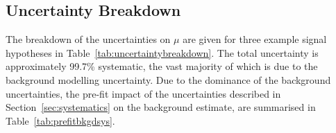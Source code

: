 \documentclass[NOTE, atlasdraft=true, texlive=2017, UKenglish]{\ATLASLATEXPATH atlasdoc}
\begin{document}


\subsection{Uncertainty Breakdown}
\label{sec:uncertaintybreakdown}

The breakdown of the uncertainties on $\mu$ are given for three example signal hypotheses in Table~\ref{tab:uncertaintybreakdown}. The total uncertainty is approximately 99.7\% systematic, the vast majority of which is due to the background modelling uncertainty. Due to the dominance of the background uncertainties, the pre-fit impact of the uncertainties described in Section~\ref{sec:systematics} on the background estimate, are summarised in Table~\ref{tab:prefitbkgdsys}.
\end{document}
